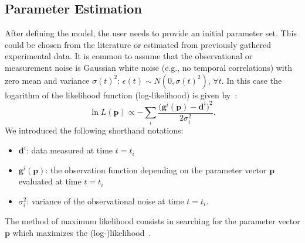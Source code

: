 \documentclass[graybox]{svmult}
\newcommand{\mbp}{\mathbf{p}}
\newcommand{\mbd}{\mathbf{d}}
\begin{document}
\subsection*{Parameter Estimation}
After defining the model, the user needs to provide an initial parameter set.
This could be chosen from the literature or estimated from previously gathered experimental data.
It is common to assume that the observational or measurement noise is Gaussian white noise (e.g., no temporal correlations) with zero mean and variance $\sigma(t)^2$: $\epsilon(t) \sim N(0, \sigma(t)^2)$, $\forall t$.
In this case the logarithm of the likelihood function (log-likelihood) is given by~\cite{kreutzProfileLikelihood2013}:
\begin{equation}
    \ln L(\mbp) \propto - \sum_{i}\frac{ \big(\mathbf{g}^{i}(\mbp) - \mbd^{i}\big)^2}{2 \sigma_{i}^2}.
    \label{eq:likelihood_Gaussian}
\end{equation}
We introduced the following shorthand notations:
\begin{itemize}
\item $\mbd^{i}$: data measured at time $t=t_i$
\item $\mathbf{g}^{i}(\mbp)$: the observation function depending on the parameter vector $\mbp$ evaluated at time $t=t_i$
\item $\sigma_{i}^2$: variance of the observational noise at time $t=t_i$.
\end{itemize}
The method of maximum likelihood consists in searching for the parameter vector $\mbp$ which maximizes the (log-)likelihood~\cite{gaborRobustEfficient2015}.
%
%
\end{document}
